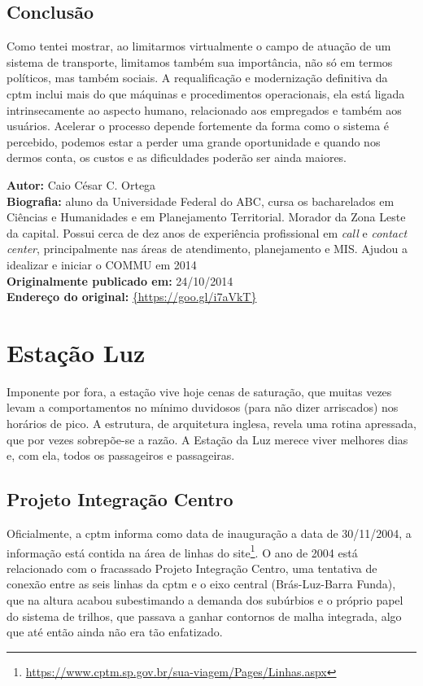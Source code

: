 \documentclass[11pt,fleqn]{book} %
\newcommand{\infocaio}[2]{\textbf{Autor:} Caio C\'{e}sar C. Ortega \\ \textbf{Biografia:} aluno da Universidade Federal do ABC, cursa os bacharelados em Ci\^{e}ncias e Humanidades e em Planejamento Territorial. Morador da Zona Leste da capital. Possui cerca de dez anos de experi\^{e}ncia profissional em \textit{call} e \textit{contact center}, principalmente nas \'{a}reas de atendimento, planejamento e MIS. Ajudou a idealizar e iniciar o COMMU em 2014 \\ \textbf{Originalmente publicado em:} {#1} \\ \textbf{Endere\c{c}o do original:} \url{{#2}}}
\begin{document}
\subsection{Conclusão}

Como tentei mostrar, ao limitarmos virtualmente o campo de atuação de um sistema de transporte, limitamos também sua importância, não só em termos políticos, mas também sociais. A requalificação e modernização definitiva da \gls{cptm} inclui mais do que máquinas e procedimentos operacionais, ela está ligada intrinsecamente ao aspecto humano, relacionado aos empregados e também aos usuários. Acelerar o processo depende fortemente da forma como o sistema é percebido, podemos estar a perder uma grande oportunidade e quando nos dermos conta, os custos e as dificuldades poderão ser ainda maiores.

\begin{info}
	\infocaio{24/10/2014}{https://goo.gl/i7aVkT}
\end{info}

\section{Estação Luz}\label{s:luz}

Imponente por fora, a estação vive hoje cenas de saturação, que muitas vezes levam a comportamentos no mínimo duvidosos (para não dizer arriscados) nos horários de pico. A estrutura, de arquitetura inglesa, revela uma rotina apressada, que por vezes sobrepõe-se a razão. A Estação da Luz merece viver melhores dias e, com ela, todos os passageiros e passageiras.

\subsection{Projeto Integração Centro}\label{ss:icentro}

Oficialmente, a \gls{cptm} informa como data de inauguração a data de 30/11/2004, a informação está contida na área de linhas do site\footnote{\url{https://www.cptm.sp.gov.br/sua-viagem/Pages/Linhas.aspx}}. O ano de 2004 está relacionado com o fracassado Projeto Integração Centro, uma tentativa de conexão entre as seis linhas da \gls{cptm} e o eixo central (Brás-Luz-Barra Funda), que na altura acabou subestimando a demanda dos subúrbios e o próprio papel do sistema de trilhos, que passava a ganhar contornos de malha integrada, algo que até então ainda não era tão enfatizado.
\end{document}
